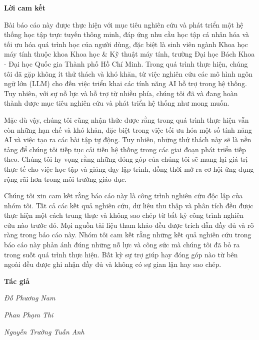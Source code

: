 \documentclass[12pt,a4paper]{report}
\theoremstyle{definition}
\begin{document}
\newpage
\begin{center}
    \textbf{\Large Lời cam kết}
\end{center}

\par Bài báo cáo này được thực hiện với mục tiêu nghiên cứu và phát triển một hệ thống học tập trực tuyến thông minh, đáp ứng nhu cầu học tập cá nhân hóa và tối ưu hóa quá trình học của người dùng, đặc biệt là sinh viên ngành Khoa học máy tính thuộc khoa Khoa học \& Kỹ thuật máy tính, trường Đại học Bách Khoa - Đại học Quốc gia Thành phố Hồ Chí Minh. Trong quá trình thực hiện, chúng tôi đã gặp không ít thử thách và khó khăn, từ việc nghiên cứu các mô hình ngôn ngữ lớn (LLM) cho đến việc triển khai các tính năng AI hỗ trợ trong hệ thống. Tuy nhiên, với sự nỗ lực và hỗ trợ từ nhiều phía, chúng tôi đã và đang hoàn thành được mục tiêu nghiên cứu và phát triển hệ thống như mong muốn.
\par Mặc dù vậy, chúng tôi cũng nhận thức được rằng trong quá trình thực hiện vẫn còn những hạn chế và khó khăn, đặc biệt trong việc tối ưu hóa một số tính năng AI và việc tạo ra các bài tập tự động. Tuy nhiên, những thử thách này sẽ là nền tảng để chúng tôi tiếp tục cải tiến hệ thống trong các giai đoạn phát triển tiếp theo. Chúng tôi hy vọng rằng những đóng góp của chúng tôi sẽ mang lại giá trị thực tế cho việc học tập và giảng dạy lập trình, đồng thời mở ra cơ hội ứng dụng rộng rãi hơn trong môi trường giáo dục.
\par Chúng tôi xin cam kết rằng báo cáo này là công trình nghiên cứu độc lập của nhóm tôi. Tất cả các kết quả nghiên cứu, dữ liệu thu thập và phân tích đều được thực hiện một cách trung thực và không sao chép từ bất kỳ công trình nghiên cứu nào trước đó. Mọi nguồn tài liệu tham khảo đều được trích dẫn đầy đủ và rõ ràng trong báo cáo này. Nhóm tôi cam kết rằng những kết quả nghiên cứu trong báo cáo này phản ánh đúng những nỗ lực và công sức mà chúng tôi đã bỏ ra trong suốt quá trình thực hiện. Bất kỳ sự trợ giúp hay đóng góp nào từ bên ngoài đều được ghi nhận đầy đủ và không có sự gian lận hay sao chép.

\par\hfill\textbf{Tác giả}\hspace{1cm}
\par\hfill\textit{Đỗ Phương Nam}
\par\hfill\textit{Phan Phạm Thi}\hspace{0.3cm}
\par\hfill\textit{Nguyễn Trường Tuấn Anh}\hspace{0.2cm}
\newpage
\end{document}
